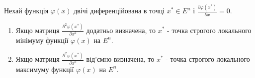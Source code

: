 \documentclass[12pt,a4paper]{article}
\begin{document}
\begin{theorem3}
Нехай функція $\varphi\left(x\right)$ двічі диференційована в точці ${x}^*\in {E}^n$ і $\frac{\partial\varphi\left({x}^*\right)}{\partial x}=0$.
\begin{enumerate}
\item Якщо матриця $\frac{{\partial}^2\varphi\left({x}^*\right)}{\partial {x}^2}$ додатньо визначена, то ${x}^*$ - точка строгого локального мінімуму функції $\varphi\left(x\right)$ на ${E}^n$.
\item Якщо матриця $\frac{{\partial}^2\varphi\left({x}^*\right)}{\partial {x}^2}$ від'ємно визначена, то ${x}^*$ - точка строгого локального максимуму функції $\varphi\left(x\right)$ на ${E}^n$.
\end{enumerate} 
\end{theorem3}
\end{document}
